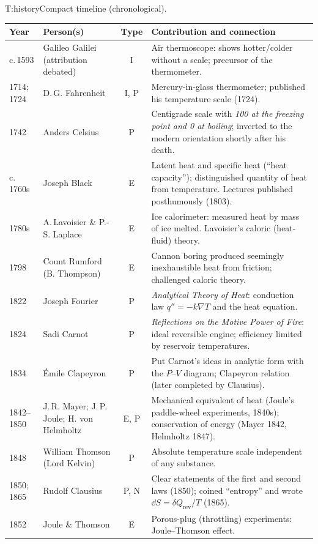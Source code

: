 \begin{reftab}{T:history}{Compact timeline (chronological).}
\small
\renewcommand{\arraystretch}{1.08}
\begin{tabularx}{\textwidth}{@{}lL{0.21\textwidth}cY@{}}
\toprule
Year & Person(s) & Type & Contribution and connection\\
\midrule
c.\,1593 & Galileo Galilei (attribution debated) & I & Air thermoscope: shows hotter/colder without a scale; precursor of the thermometer.\\
1714; 1724 & D.\,G. Fahrenheit & I, P & Mercury-in-glass thermometer; published his temperature scale (1724).\\
1742 & Anders Celsius & P & Centigrade scale with \emph{100 at the freezing point and 0 at boiling}; inverted to the modern orientation shortly after his death.\\
c.\,1760s & Joseph Black & E & Latent heat and specific heat (``heat capacity''); distinguished quantity of heat from temperature. Lectures published posthumously (1803).\\
1780s & A.\,Lavoisier \& P.-S. Laplace & E & Ice calorimeter: measured heat by mass of ice melted. Lavoisier's caloric (heat-fluid) theory.\\
1798 & Count Rumford (B. Thompson) & E & Cannon boring produced seemingly inexhaustible heat from friction; challenged caloric theory.\\
1822 & Joseph Fourier & P & \emph{Analytical Theory of Heat}: conduction law $q''=-k\nabla T$ and the heat equation.\\
1824 & Sadi Carnot & P & \emph{Reflections on the Motive Power of Fire}: ideal reversible engine; efficiency limited by reservoir temperatures.\\
1834 & \'Emile Clapeyron & P & Put Carnot's ideas in analytic form with the $P$--$V$ diagram; Clapeyron relation (later completed by Clausius).\\
1842--1850 & J.\,R. Mayer; J.\,P. Joule; H. von Helmholtz & E, P & Mechanical equivalent of heat (Joule's paddle-wheel experiments, 1840s); conservation of energy (Mayer 1842, Helmholtz 1847).\\
1848 & William Thomson (Lord Kelvin) & P & Absolute temperature scale independent of any substance.\\
1850; 1865 & Rudolf Clausius & P, N & Clear statements of the first and second laws (1850); coined ``entropy'' and wrote $\dd S=\delta Q_{\text{rev}}/T$ (1865).\\
1852 & Joule \& Thomson & E & Porous-plug (throttling) experiments: Joule--Thomson effect.\\

\end{tabularx}
\end{reftab}
